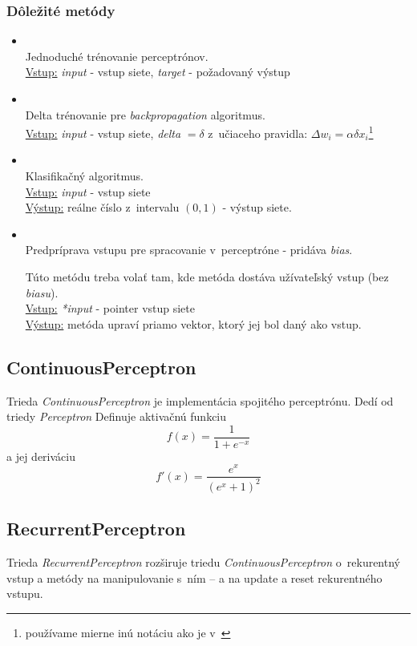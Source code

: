 \subsubsection{Dôležité metódy}
\begin{itemize}
\item {}
\\Jednoduché trénovanie perceptrónov.
\\ \underline{Vstup:} \textit{input} - vstup siete, \textit{target} - požadovaný výstup 
\item {}
\\Delta trénovanie pre \textit{backpropagation} algoritmus.
\\ \underline{Vstup:} \textit{input} - vstup siete, \textit{delta} $=\delta$ z~učiaceho pravidla: $\Delta w_i = \alpha\delta x_i$\footnote{používame mierne inú notáciu ako je v~\cite{haykin1999neural}} \cite[s. 74]{haykin1999neural}
\item {}
\\Klasifikačný algoritmus.
\\ \underline{Vstup:} \textit{input} - vstup siete
\\ \underline{Výstup:} reálne číslo z~intervalu $(0,1)$ - výstup siete.
\item {}
\\Predpríprava vstupu pre spracovanie v~perceptróne - pridáva \textit{bias}.

Túto metódu treba volať tam, kde metóda dostáva užívateľský vstup (bez \textit{biasu}).
\\ \underline{Vstup:} \textit{*input} - pointer vstup siete
\\ \underline{Výstup:} metóda upraví priamo vektor, ktorý jej bol daný ako vstup.
\end{itemize}

\subsection{ContinuousPerceptron}
Trieda \textit{ContinuousPerceptron} je implementácia spojitého perceptrónu. Dedí od triedy \textit{Perceptron} 
Definuje aktivačnú funkciu
$$f(x)=\frac{1}{1+e^{-x}} $$
a jej deriváciu
$$f'(x)=\frac{e^x}{(e^x+1)^2} $$

\subsection{RecurrentPerceptron}
Trieda \textit{RecurrentPerceptron} rozširuje triedu \textit{ContinuousPerceptron} o~rekurentný vstup a metódy na manipulovanie s~ním --  a  na update a reset rekurentného vstupu.

